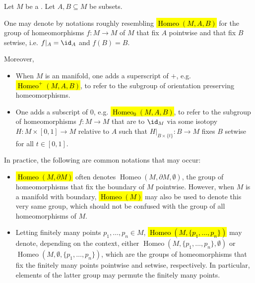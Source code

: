 \begin{notation} \label{notation:homeomorphism_groups_of_a_topological_space_manifolds}
    Let $M$ be a .
    Let $A, B \subseteq M$ be subsets. 
    
    One may denote by notations roughly resembling \hl{$\operatorname{Homeo}(M,A,B)$} for the group of homeomorphisms $f: M \to M$ of $M$ that fix $A$ pointwise and that fix $B$ setwise, i.e. $f|_A = \id_A$ and $f(B) = B$. 
    
    Moreover, 
    \begin{itemize}
        \item When $M$ is an  manifold, one adds a superscript of $+$, e.g. \hl{$\operatorname{Homeo}^+(M,A,B)$}, to refer to the subgroup of orientation preserving homeomorphisms.

        \item One adds a subscript of $0$, e.g. \hl{$\operatorname{Homeo}_0(M,A,B)$}, to refer to the subgroup of homeomorphisms $f: M \to M$ that are  to $\id_M$ via some isotopy $H: M \times [0,1] \to M$ relative to $A$ such that $H|_{B \times \{t\}}: B \to M$ fixes $B$ setwise for all $t \in [0,1]$. 
    \end{itemize}

    In practice, the following are common notations that may occur:
    \begin{itemize}
        \item \hl{$\operatorname{Homeo}(M, \partial M)$} often denotes $\operatorname{Homeo}(M, \partial M, \emptyset)$, the group of homeomorphisms that fix the boundary of $M$ pointwise. However, when $M$ is a manifold with boundary, \hl{$\operatorname{Homeo}(M)$} may also be used to denote this very same group, which should not be confused with the group of all homeomorphisms of $M$. 

        \item Letting finitely many points $p_1,\ldots,p_n \in M$,  \hl{$\operatorname{Homeo}(M, \{p_1,\ldots,p_n\})$} may denote, depending on the context, either $\operatorname{Homeo}(M, \{p_1,\ldots,p_n\}, \emptyset)$ or $\operatorname{Homeo}(M, \emptyset, \{p_1,\ldots,p_n\})$, which are the groups of homeomorphisms that fix the finitely many points pointwise and setwise, respectively. In particular, elements of the latter group may permute the finitely many points.
    \end{itemize}


\end{notation}
